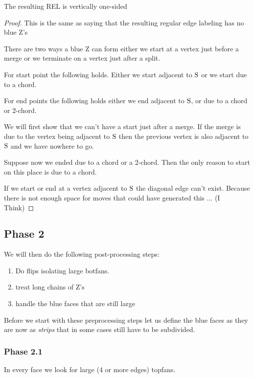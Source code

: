       \begin{lemma}
        \label{lm:}
        The resulting REL is vertically one-sided
      \end{lemma}
      \begin{proof}
        This is the same as saying that the resulting regular edge labeling has no blue Z's

        There are two ways a blue Z can form either we start at a vertex just before a merge or we terminate on a vertex just after a split.

        For start point the following holds. Either we start adjacent to $\mathrm{S}$ or we start due to a chord.

        For end points the following holds either we end adjacent to $\mathrm{S}$, or due to a chord or 2-chord.


        We will first show that we can't have a start just after a merge.
        If the merge is due to the vertex being adjacent to $\mathrm{S}$ then the previous vertex is also adjacent to $\mathrm{S}$ and we have nowhere to go. 

        Suppose now we ended due to a chord or a 2-chord. Then the only reason to start on this place is due to a chord.

        If we start or end at a vertex adjacent to $\mathrm{S}$ the diagonal edge can't exist. Because there is not enough space for moves that could have generated this ... (I Think)



      \end{proof}

\subsection{Phase 2}
  We will then do the following post-processing steps:

  \begin{enumerate}
    \item Do flips isolating large botfans.
    \item treat long chains of Z's
    \item handle the blue faces that are still large
  \end{enumerate}

  Before we start with these preprocessing steps let us define the blue faces as they are now as \emph{strips} that in some cases still have to be subdivided.

  \subsubsection{Phase 2.1}
    In every face we look for large (4 or more edges) topfans.


